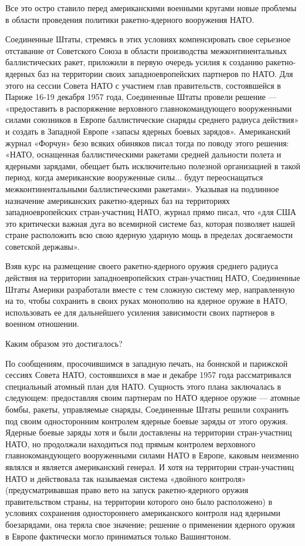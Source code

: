 \documentclass[12pt, a4paper, openany]{book}
\begin{document}
	Все это остро ставило перед американскими военными кругами новые проблемы в области проведения политики ракетно-ядерного вооружения НАТО.
	
	Соединенные Штаты, стремясь в этих условиях компенсировать свое серьезное отставание от Советского Союза в области производства межконтинентальных баллистических ракет, приложили в первую очередь усилия к созданию ракетно-ядерных баз на территории своих западноевропейских партнеров по НАТО. Для этого на сессии Совета НАТО с участием глав правительств, состоявшейся в Париже 16-19 декабря 1957 года, Соединенные Штаты провели решение — «предоставить в распоряжение верховного главнокомандующего вооруженными силами союзников в Европе баллистические снаряды среднего радиуса действия» и создать в Западной Европе «запасы ядерных боевых зарядов». Американский журнал «Форчун» безо всяких обиняков писал тогда по поводу этого решения: «НАТО, оснащенная баллистическими ракетами средней дальности полета и ядерными зарядами, обещает быть исключительно полезной организацией в такой период, когда американские вооруженные силы... будут переоснащаться межконтинентальными баллистическими ракетами». Указывая на подлинное назначение американских ракетно-ядерных баз на территориях западноевропейских стран-участниц НАТО, журнал прямо писал, что «для США это критически важная дуга во всемирной системе баз, которая позволяет нашей стране расположить всю свою ядерную ударную мощь в пределах досягаемости советской державы».
	
	Взяв курс на размещение своего ракетно-ядерного оружия среднего радиуса действия на территории западноевропейских стран-участниц НАТО, Соединенные Штаты Америки разработали вместе с тем сложную систему мер, направленную на то, чтобы сохранить в своих руках монополию на ядерное оружие в НАТО, использовать ее для дальнейшего усиления зависимости своих партнеров в военном отношении.
	
	Каким образом это достигалось?
	
	По сообщениям, просочившимся в западную печать, на боннской и парижской сессиях Совета НАТО, состоявшихся в мае и декабре 1957 года рассматривался специальный атомный план для НАТО. Сущность этого плана заключалась в следующем: предоставляя своим партнерам по НАТО ядерное оружие — атомные бомбы, ракеты, управляемые снаряды, Соединенные Штаты решили сохранить под своим односторонним контролем ядерные боевые заряды от этого оружия. Ядерные боевые заряды хотя и были доставлены на территории стран-участниц НАТО, но продолжали находиться под прямым контролем верховного главнокомандующего вооруженными силами НАТО в Европе, каковым неизменно являлся и является американский генерал. И хотя на территории стран-участниц НАТО и действовала так называемая система «двойного контроля» (предусматривавшая право вето на запуск ракетно-ядерного оружия правительством страны, на территории которого оно было расположено) в условиях сохранения одностороннего американского контроля над ядерными боезарядами, она теряла свое значение; решение о применении ядерного оружия в Европе фактически могло приниматься только Вашингтоном.
	
\end{document}
